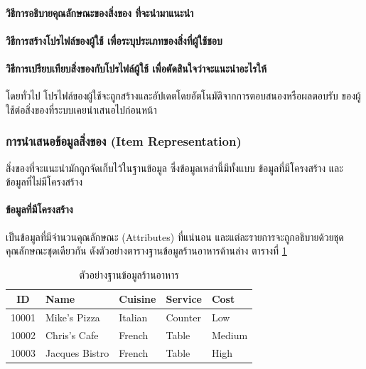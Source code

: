 \paragraph{วิธีการอธิบายคุณลักษณะของสิ่งของ ที่จะนำมาแนะนำ}

\paragraph{วิธีการสร้างโปรไฟล์ของผู้ใช้ เพื่อระบุประเภทของสิ่งที่ผู้ใช้ชอบ}

\paragraph{วิธีการเปรียบเทียบสิ่งของกับโปรไฟล์ผู้ใช้ เพื่อตัดสินใจว่าจะแนะนำอะไรให้}
โดยทั่วไป โปรไฟล์ของผู้ใช้จะถูกสร้างและอัปเดตโดยอัตโนมัติจากการตอบสนองหรือผลตอบรับ ของผู้ใช้ต่อสิ่งของที่ระบบเคยนำเสนอไปก่อนหน้า  


\subsubsection{การนำเสนอข้อมูลสิ่งของ (Item Representation)}

สิ่งของที่จะแนะนำมักถูกจัดเก็บไว้ในฐานข้อมูล ซึ่งข้อมูลเหล่านี้มีทั้งแบบ ข้อมูลที่มีโครงสร้าง และ ข้อมูลที่ไม่มีโครงสร้าง \cite{pazzani2007} 

\paragraph{ข้อมูลที่มีโครงสร้าง} เป็นข้อมูลที่มีจำนวนคุณลักษณะ (Attributes) ที่แน่นอน และแต่ละรายการจะถูกอธิบายด้วยชุดคุณลักษณะชุดเดียวกัน  ดังตัวอย่างตารางฐานข้อมูลร้านอาหารด้านล่าง ตารางที่ \ref{tab:exampleDBrestaurant}

\begin{table}[H]
\centering
\caption{ตัวอย่างฐานข้อมูลร้านอาหาร \cite{pazzani2007}}
\label{tab:exampleDBrestaurant}
\begin{tabular}{|c|l|l|l|l|}
\hline
\textbf{ID} & \textbf{Name} & \textbf{Cuisine} & \textbf{Service} & \textbf{Cost} \\
\hline
10001 & Mike's Pizza & Italian & Counter & Low \\ \hline
10002 & Chris's Cafe & French  & Table & Medium\\ \hline
10003 & Jacques Bistro  & French  & Table & High\\\hline
\end{tabular}
\end{table}

